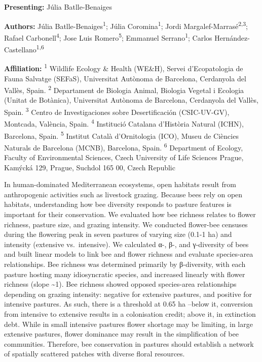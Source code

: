 \documentclass[
  letterpaper,
  DIV=11,
  numbers=noendperiod]{scrartcl}
\begin{document}
\textbf{Presenting:} Júlia Batlle-Benaiges

\textbf{Authors:} Júlia Batlle-Benaiges\textsuperscript{1}; Júlia
Coromina\textsuperscript{1}; Jordi
Margalef-Marrasé\textsuperscript{2,3}; Rafael
Carbonell\textsuperscript{4}; Jose Luis Romero\textsuperscript{5};
Emmanuel Serrano\textsuperscript{1}; Carlos
Hernández-Castellano\textsuperscript{1,6}

\textbf{Affiliation:} \textsuperscript{1} Wildlife Ecology \& Health
(WE\&H), Servei d'Ecopatologia de Fauna Salvatge (SEFaS), Universitat
Autònoma de Barcelona, Cerdanyola del Vallès, Spain. \textsuperscript{2}
Departament de Biologia Animal, Biologia Vegetal i Ecologia (Unitat de
Botànica), Universitat Autònoma de Barcelona, Cerdanyola del Vallès,
Spain. \textsuperscript{3} Centro de Investigaciones sobre
Desertificación (CSIC-UV-GV), Montcada, València, Spain.
\textsuperscript{4} Institució Catalana d'Història Natural (ICHN),
Barcelona, Spain. \textsuperscript{5} Institut Català d'Ornitologia
(ICO), Museu de Ciències Naturals de Barcelona (MCNB), Barcelona, Spain.
\textsuperscript{6} Department of Ecology, Faculty of Environmental
Sciences, Czech University of Life Sciences Prague, Kamýcká 129, Prague,
Suchdol 165 00, Czech Republic

In human-dominated Mediterranean ecosystems, open habitats result from
anthropogenic activities such as livestock grazing. Because bees rely on
open habitats, understanding how bee diversity responds to pasture
features is important for their conservation. We evaluated how bee
richness relates to flower richness, pasture size, and grazing
intensity. We conducted flower-bee censuses during the flowering peak in
seven pastures of varying size (0.1-1 ha) and intensity (extensive
vs.~intensive). We calculated α-, β-, and γ-diversity of bees and built
linear models to link bee and flower richness and evaluate species-area
relationships. Bee richness was determined primarily by β-diversity,
with each pasture hosting many idiosyncratic species, and increased
linearly with flower richness (slope \textasciitilde1). Bee richness
showed opposed species-area relationships depending on grazing
intensity: negative for extensive pastures, and positive for intensive
pastures. As such, there is a threshold at 0.65 ha --below it,
conversion from intensive to extensive results in a colonisation credit;
above it, in extinction debt. While in small intensive pastures flower
shortage may be limiting, in large extensive pastures, flower dominance
may result in the simplification of bee communities. Therefore, bee
conservation in pastures should establish a network of spatially
scattered patches with diverse floral resources.
\end{document}
